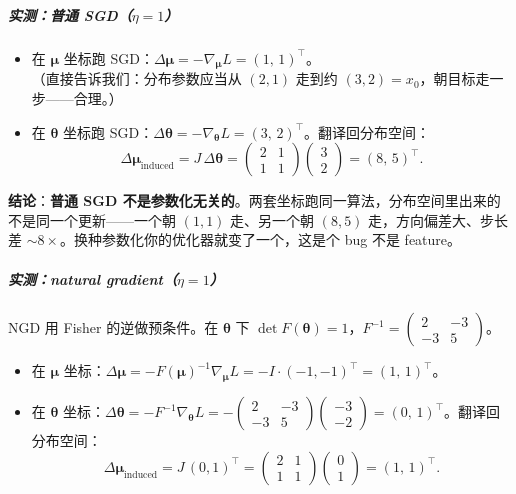 \documentclass[11pt,a4paper]{article}
\theoremstyle{mythm}
\theoremstyle{mydef}
\begin{document}
\subparagraph{实测：普通 SGD（$\eta=1$）}
\begin{itemize}[leftmargin=2em]
\item 在 $\boldsymbol\mu$ 坐标跑 SGD：$\Delta\boldsymbol\mu = -\nabla_{\boldsymbol\mu}L = (1,\,1)^\top$。\\
\quad（直接告诉我们：分布参数应当从 $(2,1)$ 走到约 $(3,2) = x_0$，朝目标走一步——合理。）
\item 在 $\boldsymbol\theta$ 坐标跑 SGD：$\Delta\boldsymbol\theta = -\nabla_{\boldsymbol\theta}L = (3,\,2)^\top$。翻译回分布空间：
$$\Delta\boldsymbol\mu_{\text{induced}} = J\,\Delta\boldsymbol\theta = \begin{pmatrix}2 & 1\\ 1 & 1\end{pmatrix}\!\begin{pmatrix}3\\ 2\end{pmatrix} = (8,\,5)^\top.$$
\end{itemize}

\begin{center}
\end{center}

\textbf{结论}：\textbf{普通 SGD 不是参数化无关的}。两套坐标跑同一算法，分布空间里出来的不是同一个更新——一个朝 $(1,1)$ 走、另一个朝 $(8,5)$ 走，方向偏差大、步长差 $\sim 8\times$。换种参数化你的优化器就变了一个，这是个 bug 不是 feature。

\subparagraph{实测：natural gradient（$\eta=1$）}
NGD 用 Fisher 的逆做预条件。在 $\boldsymbol\theta$ 下 $\det F(\boldsymbol\theta) = 1$，$F^{-1} = \begin{pmatrix}2 & -3\\ -3 & 5\end{pmatrix}$。
\begin{itemize}[leftmargin=2em]
\item 在 $\boldsymbol\mu$ 坐标：$\Delta\boldsymbol\mu = -F(\boldsymbol\mu)^{-1}\nabla_{\boldsymbol\mu}L = -I\cdot(-1,-1)^\top = (1,\,1)^\top$。
\item 在 $\boldsymbol\theta$ 坐标：$\Delta\boldsymbol\theta = -F^{-1}\nabla_{\boldsymbol\theta}L = -\begin{pmatrix}2 & -3\\ -3 & 5\end{pmatrix}\!\begin{pmatrix}-3\\ -2\end{pmatrix} = (0,\,1)^\top$。翻译回分布空间：
$$\Delta\boldsymbol\mu_{\text{induced}} = J\,(0,1)^\top = \begin{pmatrix}2 & 1\\ 1 & 1\end{pmatrix}\!\begin{pmatrix}0\\ 1\end{pmatrix} = (1,\,1)^\top.$$
\end{itemize}
\end{document}
